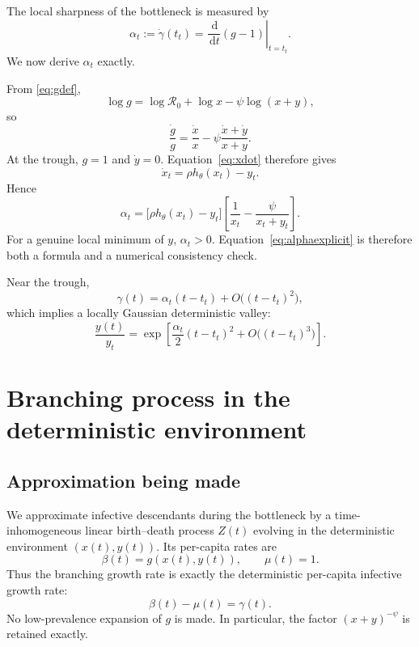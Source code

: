 \documentclass[11pt]{article}
\newcommand{\Rzero}{\mathcal R_0}
\newcommand{\hth}{h_\theta}
\newcommand{\dd}{\,\mathrm d}
\newcommand{\gam}{\gamma}
\begin{document}
The local sharpness of the bottleneck is measured by
\begin{equation}
\alpha_t:=\dot\gam(t_t)=\left.\frac{\dd}{\dd t}(g-1)\right|_{t=t_t}.\label{eq:alphadef}
\end{equation}
We now derive \(\alpha_t\) exactly.

From \eqref{eq:gdef},
\[
\log g=\log\Rzero+\log x-\psi\log(x+y),
\]
so
\begin{equation}
\frac{\dot g}{g}
=\frac{\dot x}{x}-\psi\frac{\dot x+\dot y}{x+y}.
\end{equation}
At the trough, \(g=1\) and \(\dot y=0\). Equation~\eqref{eq:xdot} therefore gives
\[
\dot x_t=\rho\hth(x_t)-y_t.
\]
Hence
\begin{equation}
\boxed{
\alpha_t
=
\bigl[\rho\hth(x_t)-y_t\bigr]
\left[
\frac1{x_t}-\frac{\psi}{x_t+y_t}
\right].}
\label{eq:alphaexplicit}
\end{equation}
For a genuine local minimum of \(y\), \(\alpha_t>0\). Equation~\eqref{eq:alphaexplicit} is therefore both a formula and a numerical consistency check.

Near the trough,
\begin{equation}
\gam(t)=\alpha_t(t-t_t)+O\bigl((t-t_t)^2\bigr),\label{eq:gammalocal}
\end{equation}
which implies a locally Gaussian deterministic valley:
\begin{equation}
\frac{y(t)}{y_t}
=
\exp\left[
\frac{\alpha_t}{2}(t-t_t)^2+O\bigl((t-t_t)^3\bigr)
\right].\label{eq:ylocal}
\end{equation}

\section{Branching process in the deterministic environment}

\subsection{Approximation being made}

We approximate infective descendants during the bottleneck by a time-inhomogeneous linear birth--death process \(Z(t)\) evolving in the deterministic environment \((x(t),y(t))\). Its per-capita rates are
\begin{equation}
\beta(t)=g(x(t),y(t)),
\qquad
\mu(t)=1.\label{eq:bdrates}
\end{equation}
Thus the branching growth rate is exactly the deterministic per-capita infective growth rate:
\[
\beta(t)-\mu(t)=\gam(t).
\]
No low-prevalence expansion of \(g\) is made. In particular, the factor \((x+y)^{-\psi}\) is retained exactly.
\end{document}
